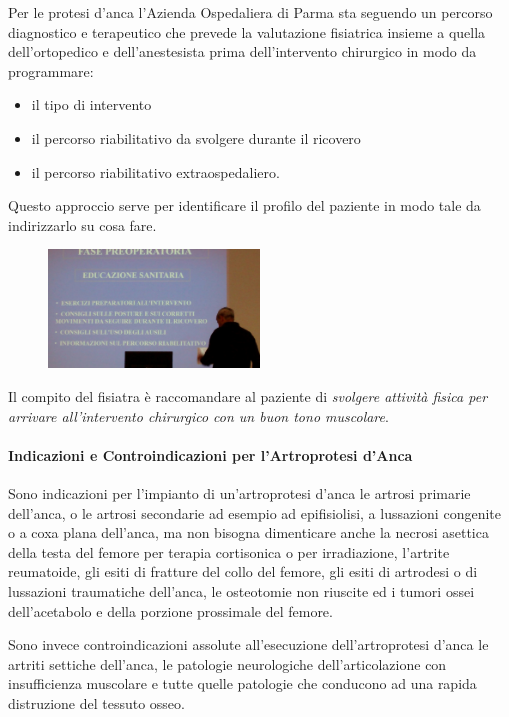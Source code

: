 Per le protesi d'anca l'Azienda Ospedaliera di Parma sta seguendo un
percorso diagnostico e terapeutico che prevede la valutazione fisiatrica
insieme a quella dell'ortopedico e dell'anestesista prima
dell'intervento chirurgico in modo da programmare:

\begin{itemize}
\item
  il tipo di intervento
\item
  il percorso riabilitativo da svolgere durante il ricovero
\item
  il percorso riabilitativo extraospedaliero.
\end{itemize}

Questo approccio serve per identificare il profilo del paziente in modo
tale da indirizzarlo su cosa
fare.


\begin{figure}[!ht]
\centering
	\includegraphics[width=0.5\textwidth]{032/image1.jpeg}
\end{figure}


Il compito del fisiatra è raccomandare al paziente di \emph{svolgere
attività fisica per arrivare all'intervento chirurgico con un buon tono
muscolare}.

\paragraph{Indicazioni e Controindicazioni per l'Artroprotesi d'Anca}


Sono indicazioni per l'impianto di un'artroprotesi d'anca le artrosi
primarie dell'anca, o le artrosi secondarie ad esempio ad epifisiolisi,
a lussazioni congenite o a coxa plana dell'anca, ma non bisogna
dimenticare anche la necrosi asettica della testa del femore per terapia
cortisonica o per irradiazione, l'artrite reumatoide, gli esiti di
fratture del collo del femore, gli esiti di artrodesi o di lussazioni
traumatiche dell'anca, le osteotomie non riuscite ed i tumori ossei
dell'acetabolo e della porzione prossimale del femore.

Sono invece controindicazioni assolute all'esecuzione dell'artroprotesi
d'anca le artriti settiche dell'anca, le patologie neurologiche
dell'articolazione con insufficienza muscolare e tutte quelle patologie
che conducono ad una rapida distruzione del tessuto osseo.

